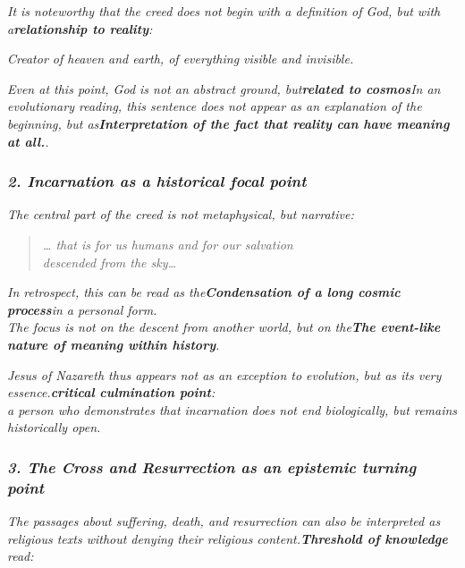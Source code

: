 \documentclass[
]{article}
\begin{document}
\emph{It is noteworthy that the creed does not begin with a definition of God, but with a\textbf{relationship to reality}:}

\emph{Creator of heaven and earth, of everything visible and invisible.}

\emph{Even at this point, God is not an abstract ground, but\textbf{related to cosmos}In an evolutionary reading, this sentence does not appear as an explanation of the beginning, but as\textbf{Interpretation of the fact that reality can have meaning at all.}.}

\subsubsection{\texorpdfstring{\emph{\textbf{2. Incarnation as a historical focal point}}}{2. Incarnation as a historical focal point}}\label{incarnation-as-a-historical-focal-point}

\emph{The central part of the creed is not metaphysical, but narrative:}

\begin{quote}
\emph{\ldots{} that is for us humans and for our salvation\\
descended from the sky\ldots{}}
\end{quote}

\emph{In retrospect, this can be read as the\textbf{Condensation of a long cosmic process}in a personal form.\\
The focus is not on the descent from another world, but on the\textbf{The event-like nature of meaning within history}.}

\emph{Jesus of Nazareth thus appears not as an exception to evolution, but as its very essence.\textbf{critical culmination point}:\\
a person who demonstrates that incarnation does not end biologically, but remains historically open.}

\subsubsection{\texorpdfstring{\emph{\textbf{3. The Cross and Resurrection as an epistemic turning point}}}{3. The Cross and Resurrection as an epistemic turning point}}\label{the-cross-and-resurrection-as-an-epistemic-turning-point}

\emph{The passages about suffering, death, and resurrection can also be interpreted as religious texts without denying their religious content.\textbf{Threshold of knowledge} read:}
\end{document}
